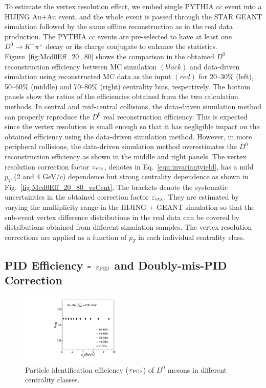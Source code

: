 \documentclass[%
 reprint,	
 amsmath,amssymb,
 aps,
 prc,
]{revtex4-1}
\begin{document}
To estimate the vertex resolution effect, we embed single PYTHIA $c\bar{c}$ event into a HIJING Au+Au event, and the whole event is passed through the STAR GEANT simulation followed by the same offline reconstruction as in the real data production. The PYTHIA $c\bar{c}$ events are pre-selected to have at least one $D^0\rightarrow K^-\pi^+$ decay or its charge conjugate to enhance the statistics. Figure~\ref{fig:Mcd0Eff_20_80} shows the comparison in the obtained $D^0$ reconstruction efficiency between MC simulation $(black)$ and data-driven simulation using reconstructed MC data as the input $(red)$ for 20--30\% (left), 50--60\% (middle) and 70--80\% (right) centrality bins, respectively. The bottom panels show the ratios of the efficiencies obtained from the two calculation methods. In central and mid-central collisions, the data-driven simulation method can properly reproduce the $D^0$ real reconstruction efficiency. This is expected since the vertex resolution is small enough so that it has negligible impact on the obtained efficiency using the data-driven simulation method. However, in more peripheral collisions, the data-driven simulation method overestimates the $D^0$ reconstruction efficiency as shown in the middle and right panels. The vertex resolution correction factor $\varepsilon_{\rm vtx}$, denotes in Eq.~\ref{equ:invariantyield}, has a mild $p_{T}$ (2 and 4 GeV/$c$) dependence but strong centrality dependence as shown in Fig.~\ref{fig:Mcd0Eff_20_80_vsCent}. The brackets denote the systematic uncertainties in the obtained correction factor $\varepsilon_{\rm vtx}$. They are estimated by varying the multiplicity range in the HIJING + GEANT simulation so that the sub-event vertex difference distributions in the real data can be covered by distributions obtained from different simulation samples. The vertex resolution corrections are applied as a function of $p_{T}$ in each individual centrality class.

\subsection{PID Efficiency - $\varepsilon_{\rm PID}$ and Doubly-mis-PID Correction}
\label{correction:PID}

\begin{figure}
\centering
\includegraphics[width=0.43\textwidth]{fig/Datad0Eff_pid_10.pdf}
\caption{Particle identification efficiency ($\varepsilon_{\rm PID}$) of $D^0$ mesons in different centrality classes.}
\label{fig:Datad0Eff_pid} 
\end{figure}
\end{document}
